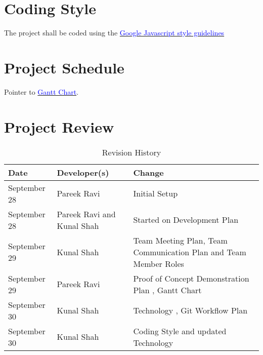 \documentclass{article}
\begin{document}
\section{Coding Style}
The project shall be coded using the \href{https://google.github.io/styleguide/javascriptguide.xml}
{\textcolor{blue}{Google Javascript style guidelines}}

\section{Project Schedule}

Pointer to \href{run:Gantt Chart.gan}{\textcolor{blue}{Gantt Chart}}.

\section{Project Review}

\newpage

\begin{table}[hp]
\caption{Revision History} \label{TblRevisionHistory}
\begin{tabularx}{\textwidth}{llX}
\toprule
\textbf{Date} & \textbf{Developer(s)} & \textbf{Change}\\
\midrule
September 28 & Pareek Ravi & Initial Setup\\
September 28 & Pareek Ravi and Kunal Shah & Started on Development Plan\\
September 29 & Kunal Shah & Team Meeting Plan, Team Communication Plan and Team Member Roles\\
September 29 & Pareek Ravi & Proof of Concept Demonstration Plan , Gantt Chart\\
September 30 & Kunal Shah & Technology , Git Workflow Plan \\
September 30 & Kunal Shah & Coding Style and updated Technology\\
\bottomrule
\end{tabularx}
\end{table}
\end{document}
